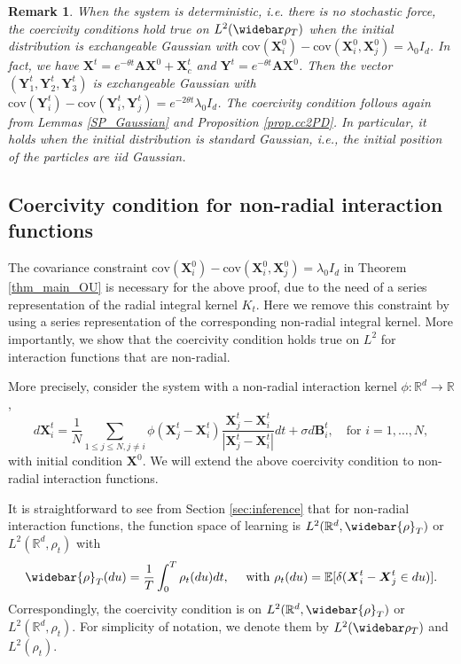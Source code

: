 \documentclass[]{elsarticle}
\def\R{\mathbb{R}}
\def\E{\mathbb{E}}
\def\thetaOU{\theta}
\newcommand{\wbar}\widebar
\newcommand{\cov}{\mathrm{cov}}
\newcommand{\mbf}[1]{\boldsymbol{#1}}
\newcommand{\bB}{\mbf{B}}
\newcommand{\bX}{\mbf{X}}
\newcommand{\bY}{\mbf{Y}}
\newcommand{\btheta}{\mbf{A}}
\newtheorem{remark}[theorem]{Remark}
\numberwithin{equation}{section}
\numberwithin{theorem}{section}
\begin{document}
\begin{remark}
When the system is deterministic, i.e. there is no stochastic force, the coercivity conditions hold true on $L^2(\wbar \rho_T)$ when the initial distribution is exchangeable Gaussian with $\cov(\bX_i^0)-\cov(\bX_i^0,\bX_j^0)=\lambda_0 I_d$.  In fact, we have $\bX^t = e^{-\thetaOU t}\btheta \bX^0+\bX_c^t$ and $\bY^t = e^{-\thetaOU t}\btheta\bX^0 $. 
Then the vector $(\bY_1^t,\bY_2^t,\bY_3^t)$ is exchangeable Gaussian with $\cov(\bY_i^t)-\cov(\bY_i^t,\bY_j^t)=e^{-2\theta t}\lambda_0 I_d$. The  coercivity condition follows again from Lemmas {\rm \ref{SP_Gaussian}} and Proposition {\rm \ref{prop.cc2PD}}. In particular, it holds when the initial distribution is standard Gaussian, i.e., the initial position of the particles are iid Gaussian. 
\end{remark}

\subsection{Coercivity condition for non-radial interaction functions}
The covariance constraint $\cov(\bX_i^0)-\cov(\bX_i^0,\bX_j^0)=\lambda_0 I_d$ in Theorem \ref{thm_main_OU} is necessary for the above proof, due to the need of a series representation of the radial integral kernel $K_t$. Here we remove this constraint by using a series representation of the corresponding non-radial integral kernel. More importantly, we show that the coercivity condition holds true on $L^2$ for interaction functions that are non-radial.  

More precisely, consider the system with a non-radial interaction kernel $\phi:\R^d\to \R$,
\begin{equation}\label{eq:sys1st_nonradial}
  d{\bX_i^t} =\frac{1}{N} \sum_{1\leq j\leq N, j\neq i} \phi(\bX_{j}^t - \bX_i^t) \frac{\bX_{j}^t - \bX_i^t}{|\bX_{j}^t - \bX_i^t|}dt+ \sigma d\bB_i^t, \quad \text{for $i = 1, \ldots, N$},
\end{equation}
with initial condition $\bX^0$. We will extend the above coercivity condition to non-radial interaction functions. 

It is straightforward to see from Section \ref{sec:inference} that for non-radial interaction functions, the function space of learning is $L^2(\R^d,\wbar{\rho}_T )$ or $L^2(\R^d,\rho_t )$ with 
 \begin{equation} \label{eq:rhoavg_Rd}
  \wbar{\rho}_T(du) = \frac{1}{T} \int_0^T \rho_t(du) dt, \quad\text{ with } \rho_t(du)=  \E[\delta(\bX_i^t-\bX_{j}^t\in du)]. 
 \end{equation}
 Correspondingly, the coercivity condition is on $L^2(\R^d,\wbar{\rho}_T)$ or $L^2(\R^d,\rho_t )$. For simplicity of notation, we denote them by $L^2(\wbar \rho_T)$ and $L^2(\rho_t)$. 
 
\end{document}
